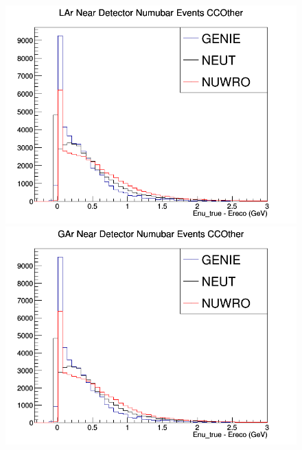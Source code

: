 \begin{figure}[h]
\endminipage
{}
\includegraphics[width=\linewidth]{Ereco_Etrue/numubar_LAr_CCOther.png}
\endminipage
{}
\includegraphics[width=\linewidth]{Ereco_Etrue/numubar_GAr_CCOther.png}
\endminipage
\newline
\end{figure}
\clearpage
